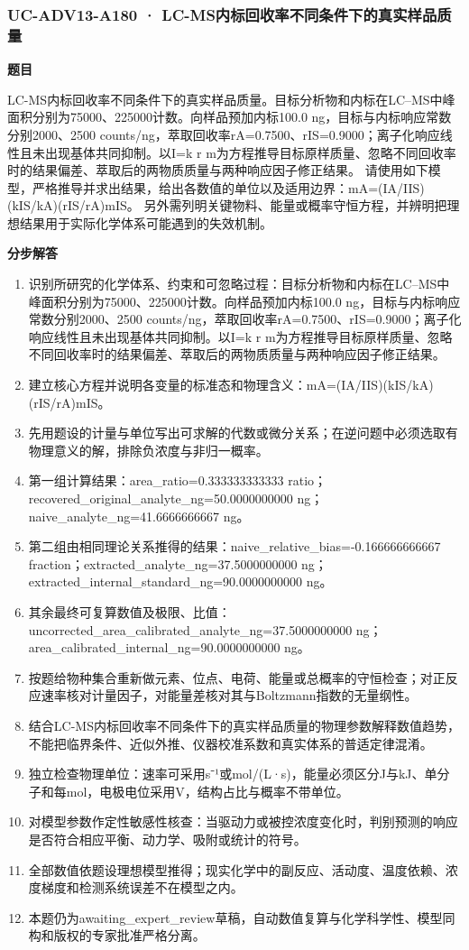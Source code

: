 \documentclass[UTF8,11pt,a4paper]{ctexart}
\begin{document}
\subsubsection*{UC-ADV13-A180 · LC-MS内标回收率不同条件下的真实样品质量}
\noindent\textbf{题目}\par
LC-MS内标回收率不同条件下的真实样品质量。目标分析物和内标在LC–MS中峰面积分别为75000、225000计数。向样品预加内标100.0 ng，目标与内标响应常数分别2000、2500 counts/ng，萃取回收率rA=0.7500、rIS=0.9000；离子化响应线性且未出现基体共同抑制。以I=k r m为方程推导目标原样质量、忽略不同回收率时的结果偏差、萃取后的两物质质量与两种响应因子修正结果。 请使用如下模型，严格推导并求出结果，给出各数值的单位以及适用边界：mA=(IA/IIS)(kIS/kA)(rIS/rA)mIS。 另外需列明关键物料、能量或概率守恒方程，并辨明把理想结果用于实际化学体系可能遇到的失效机制。\par
\medskip\noindent\textbf{分步解答}
\begin{enumerate}
\item 识别所研究的化学体系、约束和可忽略过程：目标分析物和内标在LC–MS中峰面积分别为75000、225000计数。向样品预加内标100.0 ng，目标与内标响应常数分别2000、2500 counts/ng，萃取回收率rA=0.7500、rIS=0.9000；离子化响应线性且未出现基体共同抑制。以I=k r m为方程推导目标原样质量、忽略不同回收率时的结果偏差、萃取后的两物质质量与两种响应因子修正结果。
\item 建立核心方程并说明各变量的标准态和物理含义：mA=(IA/IIS)(kIS/kA)(rIS/rA)mIS。
\item 先用题设的计量与单位写出可求解的代数或微分关系；在逆问题中必须选取有物理意义的解，排除负浓度与非归一概率。
\item 第一组计算结果：area\_ratio=0.333333333333 ratio；recovered\_original\_analyte\_ng=50.0000000000 ng；naive\_analyte\_ng=41.6666666667 ng。
\item 第二组由相同理论关系推得的结果：naive\_relative\_bias=-0.166666666667 fraction；extracted\_analyte\_ng=37.5000000000 ng；extracted\_internal\_standard\_ng=90.0000000000 ng。
\item 其余最终可复算数值及极限、比值：uncorrected\_area\_calibrated\_analyte\_ng=37.5000000000 ng；area\_calibrated\_internal\_ng=90.0000000000 ng。
\item 按题给物种集合重新做元素、位点、电荷、能量或总概率的守恒检查；对正反应速率核对计量因子，对能量差核对其与Boltzmann指数的无量纲性。
\item 结合LC-MS内标回收率不同条件下的真实样品质量的物理参数解释数值趋势，不能把临界条件、近似外推、仪器校准系数和真实体系的普适定律混淆。
\item 独立检查物理单位：速率可采用s⁻¹或mol/(L·s)，能量必须区分J与kJ、单分子和每mol，电极电位采用V，结构占比与概率不带单位。
\item 对模型参数作定性敏感性核查：当驱动力或被控浓度变化时，判别预测的响应是否符合相应平衡、动力学、吸附或统计的符号。
\item 全部数值依题设理想模型推得；现实化学中的副反应、活动度、温度依赖、浓度梯度和检测系统误差不在模型之内。
\item 本题仍为awaiting\_expert\_review草稿，自动数值复算与化学科学性、模型同构和版权的专家批准严格分离。
\end{enumerate}
\end{document}
